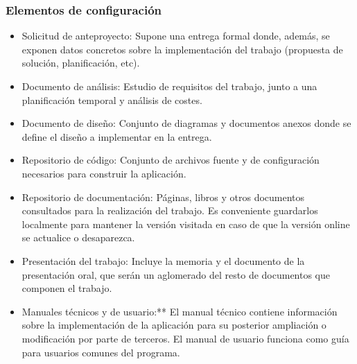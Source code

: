 \documentclass[10pt,a4paper]{article}
\begin{document}
			\subsubsection{Elementos de configuración} 
			\begin{itemize}
                \item Solicitud de anteproyecto: Supone una entrega formal donde, además, se exponen datos concretos sobre la implementación del trabajo (propuesta de solución, planificación, etc).
                \item Documento de análisis: Estudio de requisitos del trabajo, junto a una planificación temporal y análisis de costes.
                \item Documento de diseño: Conjunto de diagramas y documentos anexos donde se define el diseño a implementar en la entrega.
                \item Repositorio de código: Conjunto de archivos fuente y de configuración necesarios para construir la aplicación.
                 \item Repositorio de documentación: Páginas, libros y otros documentos consultados para la realización del trabajo. Es conveniente guardarlos localmente para mantener la versión visitada en caso de que la versión online se actualice o desaparezca.
                 \item Presentación del trabajo: Incluye la memoria y el documento de la presentación oral, que serán un aglomerado del resto de documentos que componen el trabajo.
                 \item Manuales técnicos y de usuario:** El manual técnico contiene información sobre la implementación de la                         aplicación para su posterior ampliación o modificación por parte de terceros. El manual de usuario funciona como guía para usuarios comunes del programa.
            \end{itemize}
\end{document}
